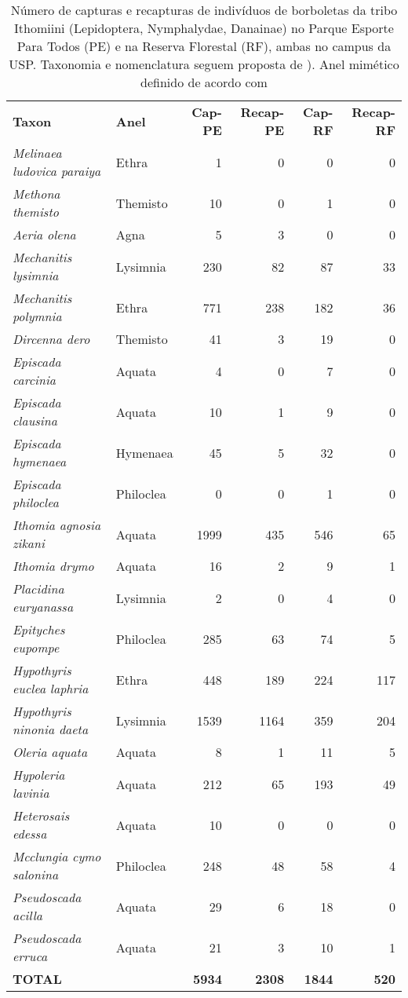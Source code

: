 \begin{table}
\caption{\label{tab:borb1} Número de capturas e recapturas de indivíduos 
de borboletas da tribo
Ithomiini (Lepidoptera, Nymphalydae, Danainae) no Parque
Esporte Para Todos (PE) e na Reserva Florestal (RF), ambas no campus da
USP. Taxonomia e nomenclatura seguem proposta de \cite{Brower_2014}). 
Anel mimético definido de acordo com \cite{Willmott_2004}}
\begin{tabular}{llrrrr}
  \textbf{Taxon} & \textbf{Anel} & \textbf{Cap-PE} & \textbf{Recap-PE} & \textbf{Cap-RF} & \textbf{Recap-RF}\\
 \emph{ Melinaea ludovica paraiya} & Ethra & 1 & 0 & 0 & 0\\
  \emph{Methona themisto} & Themisto & 10 & 0 & 1 & 0\\
  \emph{Aeria olena} & Agna & 5 & 3 & 0 & 0\\
  \emph{Mechanitis lysimnia} & Lysimnia & 230 & 82 & 87 & 33\\
  \emph{Mechanitis polymnia} & Ethra & 771 & 238 & 182 & 36\\
  \emph{Dircenna dero} & Themisto & 41 & 3 & 19 & 0\\
  \emph{Episcada carcinia} & Aquata & 4 & 0 & 7 & 0\\
  \emph{Episcada clausina} & Aquata & 10 & 1 & 9 & 0\\
  \emph{Episcada hymenaea} & Hymenaea & 45 & 5 & 32 & 0\\
  \emph{Episcada philoclea} & Philoclea & 0 & 0 & 1 & 0\\
  \emph{Ithomia agnosia zikani} & Aquata & 1999 & 435 & 546 & 65\\
  \emph{Ithomia drymo} & Aquata & 16 & 2 & 9 & 1\\
  \emph{Placidina euryanassa} & Lysimnia & 2 & 0 & 4 & 0\\
  \emph{Epityches eupompe} & Philoclea & 285 & 63 & 74 & 5\\
  \emph{Hypothyris euclea laphria} & Ethra & 448 & 189 & 224 & 117\\
  \emph{Hypothyris ninonia daeta} & Lysimnia & 1539 & 1164 & 359 & 204\\
  \emph{Oleria aquata} & Aquata & 8 & 1 & 11 & 5\\
  \emph{Hypoleria lavinia} & Aquata & 212 & 65 & 193 & 49\\
  \emph{Heterosais edessa} & Aquata & 10 & 0 & 0 & 0\\
  \emph{Mcclungia cymo salonina} & Philoclea & 248 & 48 & 58 & 4\\
  \emph{Pseudoscada acilla} & Aquata & 29 & 6 & 18 & 0\\
  \emph{Pseudoscada erruca} & Aquata & 21 & 3 & 10 & 1\\
  \textbf{TOTAL} & & \textbf{5934} & \textbf{2308} & \textbf{1844} & \textbf{520}\\
\end{tabular} 
\end{table}